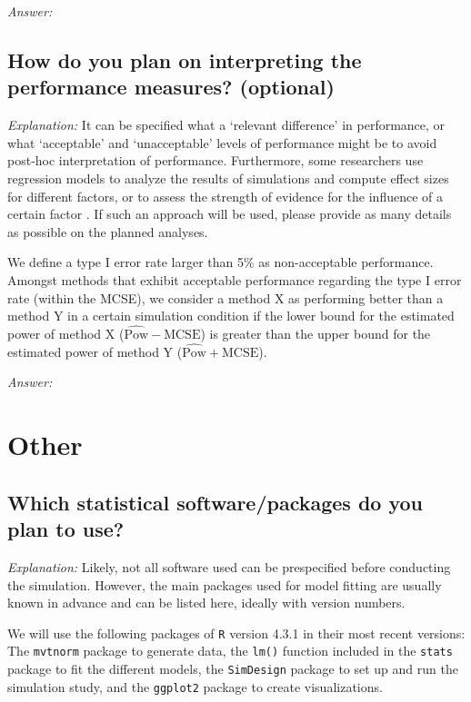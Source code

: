 \documentclass[12pt]{article}
\begin{document}
\textit{Answer:}

\subsection{How do you plan on interpreting the performance measures? \textmd{(optional)}}

\textit{Explanation:} It can be specified what a `relevant difference' in performance, or what `acceptable' and `unacceptable' levels of performance might be to avoid post-hoc interpretation of performance. Furthermore, some researchers use regression models to analyze the results of simulations and compute effect sizes for different factors, or to assess the strength of evidence for the influence of a certain factor \parencite{Skrondal2000, Chipman2022}. If such an approach will be used, please provide as many details as possible on the planned analyses.

\begin{examplebox}
We define a type I error rate larger than 5\% as non-acceptable performance. Amongst methods that exhibit acceptable performance regarding the type I error rate (within the MCSE), we consider a method X as performing better than a method Y in a certain simulation condition if the lower bound for the estimated power of method X ($\widehat{\text{Pow}}-\text{MCSE}$) is greater than the upper bound for the estimated power of method Y ($\widehat{\text{Pow}}+\text{MCSE}$).
\end{examplebox}

\textit{Answer:}

\section{Other}
\subsection{Which statistical software/packages do you plan to use?}

\textit{Explanation:} Likely, not all software used can be prespecified before conducting the simulation. However, the main packages used for model fitting are usually known in advance and can be listed here, ideally with version numbers.

\begin{examplebox}
We will use the following packages of \texttt{R} version 4.3.1 \parencite{R2020} in their most recent versions: The \texttt{mvtnorm} package \parencite{Genz2009} to generate data, the \texttt{lm()} function included in the \texttt{stats} package \parencite{R2020} to fit the different models, the \texttt{SimDesign} package \parencite{Chalmers2020} to set up  and run the simulation study, and the \texttt{ggplot2} package \parencite{Wickham2016} to create visualizations.
\end{examplebox}
\end{document}
